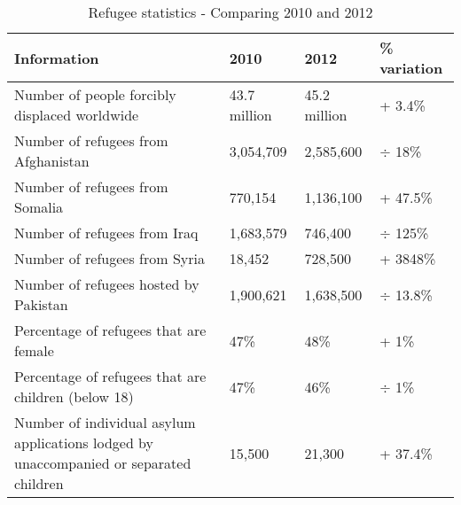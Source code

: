\begin{center}
\begin{table}[!ht]
\caption{\label{tab:refugeestatistics}Refugee statistics - Comparing 2010 and 2012 \cite{UNHCRstat2010,UNHCRstat2012}}
    \begin{tabular}{ | p{6cm} | l | l | l |}
    \hline
    \textbf{Information} & \textbf{2010} & \textbf{2012} & \textbf{\% variation}\\ 
    \hline
    Number of people forcibly displaced worldwide & 43.7 million & 45.2 million & + 3.4\% \\ 
    \hline
    Number of refugees from Afghanistan & 3,054,709 & 2,585,600 & $\div$ 18\% \\ 
    \hline
    Number of refugees from Somalia & 770,154 & 1,136,100 & + 47.5\%\\ 
    \hline
    Number of refugees from Iraq & 1,683,579 & 746,400 & $\div$ 125\% \\ 
    \hline
     Number of refugees from Syria & 18,452 & 728,500 & + 3848\% \\ 
    \hline
    Number of refugees hosted by Pakistan & 1,900,621 & 1,638,500 & $\div$ 13.8\% \\
    \hline
    Percentage of refugees that are female & 47\% & 48\% & + 1\%\\
	\hline
	Percentage of refugees that are children (below 18) & 47\% & 46\% & $\div$ 1\%\\
	\hline
	Number of individual asylum applications lodged by unaccompanied or separated children & 15,500 & 21,300 & + 37.4\% \\
	\hline
    \end{tabular}
   \end{table}
\end{center}


